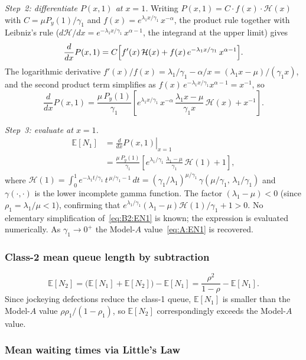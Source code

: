 \documentclass{article}
\numberwithin{equation}{section}
\begin{document}
\medskip\noindent\textit{Step~2: differentiate $P(x,1)$ at $x=1$.}\enspace
Writing $P(x,1)=C\cdot f(x)\cdot\mathcal{H}(x)$ with $C=\mu P_y(1)/\gamma_1$ and
$f(x)=e^{\lambda_1 x/\gamma_1}\,x^{-\alpha}$, the product rule together with
Leibniz's rule ($d\mathcal{H}/dx = e^{-\lambda_1 x/\gamma_1}\,x^{\alpha-1}$, the integrand
at the upper limit) gives
\[
    \frac{d}{dx}P(x,1)
    = C\Bigl[f'(x)\,\mathcal{H}(x)+f(x)\,e^{-\lambda_1 x/\gamma_1}\,x^{\alpha-1}\Bigr].
\]
The logarithmic derivative $f'(x)/f(x)=\lambda_1/\gamma_1-\alpha/x=(\lambda_1 x-\mu)/(\gamma_1 x)$,
and the second product term simplifies as
$f(x)\,e^{-\lambda_1 x/\gamma_1}x^{\alpha-1}=x^{-1}$, so
\[
    \frac{d}{dx}P(x,1)
    = \frac{\mu\,P_y(1)}{\gamma_1}\left[
        e^{\lambda_1 x/\gamma_1}\,x^{-\alpha}\,\frac{\lambda_1 x-\mu}{\gamma_1 x}\,\mathcal{H}(x)
        + x^{-1}
    \right].
\]

\medskip\noindent\textit{Step~3: evaluate at $x=1$.}\enspace
\begin{align}
    \mathbb{E}[N_1]
    &= \left.\frac{d}{dx}P(x,1)\right|_{x=1} \nonumber\\
    &= \frac{\mu\,P_y(1)}{\gamma_1}\left[
        e^{\lambda_1/\gamma_1}\,\frac{\lambda_1-\mu}{\gamma_1}\,\mathcal{H}(1) + 1
    \right],
    \label{eq:B2:EN1}
\end{align}
where $\mathcal{H}(1)=\int_0^1 e^{-\lambda_1 t/\gamma_1}\,t^{\,\mu/\gamma_1-1}\,dt
=(\gamma_1/\lambda_1)^{\mu/\gamma_1}\,\gamma(\mu/\gamma_1,\,\lambda_1/\gamma_1)$
and $\gamma(\cdot,\cdot)$ is the lower incomplete gamma function.  The
factor $(\lambda_1-\mu)<0$ (since $\rho_1=\lambda_1/\mu<1$), confirming that
$e^{\lambda_1/\gamma_1}(\lambda_1-\mu)\mathcal{H}(1)/\gamma_1 + 1 > 0$.
No elementary simplification of~\eqref{eq:B2:EN1} is known; the expression
is evaluated numerically.  As $\gamma_1\to0^+$ the
Model-$A$ value~\eqref{eq:A:EN1} is recovered.

\subsubsection*{Class-2 mean queue length by subtraction}

\[
    \mathbb{E}[N_2]
    = \bigl(\mathbb{E}[N_1]+\mathbb{E}[N_2]\bigr)-\mathbb{E}[N_1]
    = \frac{\rho^2}{1-\rho}-\mathbb{E}[N_1].
\]
Since jockeying defections reduce the class-1 queue,
$\mathbb{E}[N_1]$ is smaller than the Model-$A$ value $\rho\rho_1/(1-\rho_1)$,
so $\mathbb{E}[N_2]$ correspondingly exceeds the Model-$A$ value.

\subsubsection*{Mean waiting times via Little's Law}
\end{document}
